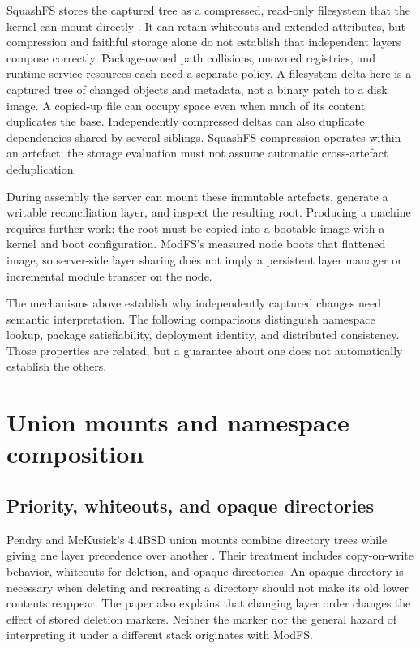 SquashFS stores the captured tree as a compressed, read-only filesystem that the kernel can mount directly \autocite{squashfs-kernel,man-mksquashfs}. It can retain whiteouts and extended attributes, but compression and faithful storage alone do not establish that independent layers compose correctly. Package-owned path collisions, unowned registries, and runtime service resources each need a separate policy. A filesystem delta here is a captured tree of changed objects and metadata, not a binary patch to a disk image. A copied-up file can occupy space even when much of its content duplicates the base. Independently compressed deltas can also duplicate dependencies shared by several siblings. SquashFS compression operates within an artefact; the storage evaluation must not assume automatic cross-artefact deduplication.

During assembly the server can mount these immutable artefacts, generate a writable reconciliation layer, and inspect the resulting root. Producing a machine requires further work: the root must be copied into a bootable image with a kernel and boot configuration. ModFS's measured node boots that flattened image, so server-side layer sharing does not imply a persistent layer manager or incremental module transfer on the node.

The mechanisms above establish why independently captured changes need semantic interpretation. The following comparisons distinguish namespace lookup, package satisfiability, deployment identity, and distributed consistency. Those properties are related, but a guarantee about one does not automatically establish the others.

\section{Union mounts and namespace composition}

\subsection{Priority, whiteouts, and opaque directories}

Pendry and McKusick's 4.4BSD union mounts combine directory trees while giving one layer precedence over another \autocite{pendry1995union}. Their treatment includes copy-on-write behavior, whiteouts for deletion, and opaque directories. An opaque directory is necessary when deleting and recreating a directory should not make its old lower contents reappear. The paper also explains that changing layer order changes the effect of stored deletion markers. Neither the marker nor the general hazard of interpreting it under a different stack originates with ModFS.

